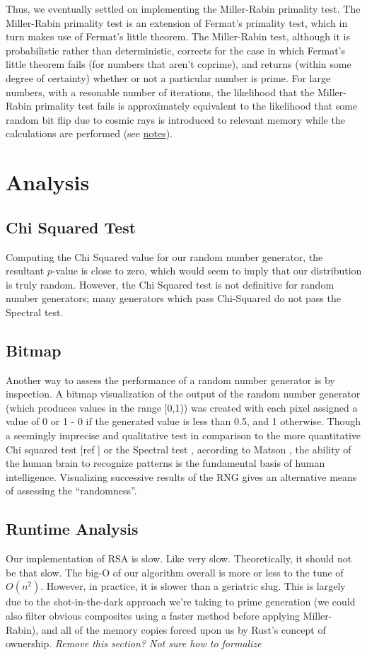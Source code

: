 \documentclass{article}
\begin{document}
Thus, we eventually settled on implementing the Miller-Rabin primality test. The Miller-Rabin primality test is an extension of Fermat's primality test, which in turn makes use of Fermat's little theorem. The Miller-Rabin test, although it is probabilistic rather than deterministic, corrects for the case in which Fermat's little theorem fails (for numbers that aren't coprime), and returns (within some degree of certainty) whether or not a particular number is prime. For large numbers, with a resonable number of iterations, the likelihood that the Miller-Rabin primality test fails is approximately equivalent to the likelihood that some random bit flip due to cosmic rays is introduced to relevant memory while the calculations are performed (see \hyperref[sec:rays]{notes}).


\section{Analysis}
\subsection{Chi Squared Test}
\label{chi}
Computing the Chi Squared value for our random number generator, the resultant $p$-value is close to zero, which would seem to imply that our distribution is truly random. However, the Chi Squared test is not definitive for random number generators; many generators which pass Chi-Squared do not pass the Spectral test.

\subsection{Bitmap}
Another way to assess the performance of a random number generator is by inspection. A bitmap visualization of the output of the random number generator (which produces values in the range [0,1)) was created with each pixel assigned a value of 0 or 1 - 0 if the generated value is less than 0.5, and 1 otherwise. Though a seemingly imprecise and qualitative test in comparison to the more quantitative Chi squared test [ref ] or the Spectral test \cite{spectral}, according to Matson \cite{matson}, the ability of the human brain to recognize patterns is the fundamental basis of human intelligence. Visualizing successive results of the RNG gives an alternative means of assessing the ``randomness''.

\subsection{Runtime Analysis}
Our implementation of RSA is slow. Like very slow. Theoretically, it should not be that slow. The big-O of our algorithm overall is more or less to the tune of $O(n^2)$. However, in practice, it is slower than a geriatric slug. This is largely due to the shot-in-the-dark approach we're taking to prime generation (we could also filter obvious composites using a faster method before applying Miller-Rabin), and all of the memory copies forced upon us by Rust's concept of ownership. \textit{Remove this section? Not sure how to formalize}
\end{document}
